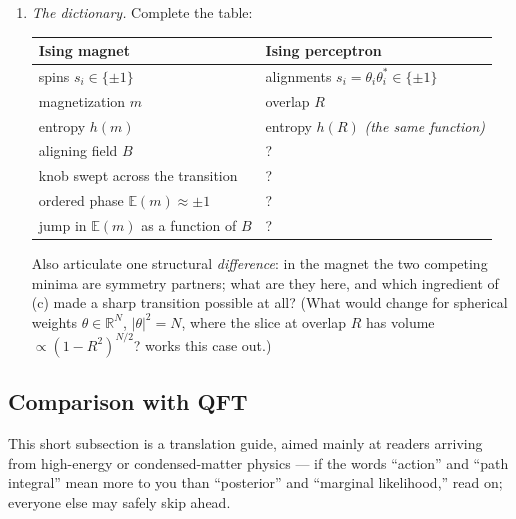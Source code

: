 \documentclass[11pt]{article}
\newcommand{\R}{\mathbb{R}}
\newcommand{\E}{\mathbb{E}}
\begin{document}
\begin{exercise}
\begin{enumerate}
    \item\label{ex:ising-h} \emph{The dictionary.} Complete the table:
    \begin{center}
    \small
    \renewcommand{\arraystretch}{1.3}
    \begin{tabular}{l|l}
        \textbf{Ising magnet} & \textbf{Ising perceptron} \\\hline
        spins $s_i\in\{\pm1\}$ & alignments $s_i = \theta_i\theta_i^*\in\{\pm1\}$ \\
        magnetization $m$ & overlap $R$ \\
        entropy $h(m)$ & entropy $h(R)$ \emph{(the same function)} \\
        aligning field $B$ & ? \\
        knob swept across the transition & ? \\
        ordered phase $\E(m)\approx\pm1$ & ? \\
        jump in $\E(m)$ as a function of $B$ & ? \\
    \end{tabular}
    \end{center}
    Also articulate one structural \emph{difference}: in the magnet the two competing minima are symmetry partners; what are they here, and which ingredient of (c) made a sharp transition possible at all? (What would change for spherical weights $\theta\in\R^N$, $|\theta|^2 = N$, where the slice at overlap $R$ has volume $\propto(1-R^2)^{N/2}$?  works this case out.)
\end{enumerate}
\end{exercise}

\subsection{Comparison with QFT}
\label{sec:QFT-comparison}

This short subsection is a translation guide, aimed mainly at readers arriving from high-energy or condensed-matter physics --- if the words ``action'' and ``path integral'' mean more to you than ``posterior'' and ``marginal likelihood,'' read on; everyone else may safely skip ahead.
\end{document}
